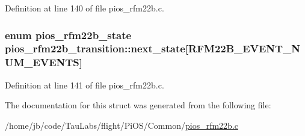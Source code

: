 \-Definition at line 140 of file pios\-\_\-rfm22b.\-c.

\hypertarget{structpios__rfm22b__transition_a0ad51f078fbfc8b875e6a26efe0b218b}{
\subsubsection[{next\-\_\-state}]{\setlength{\rightskip}{0pt plus 5cm}enum {\bf pios\-\_\-rfm22b\-\_\-state} {\bf pios\-\_\-rfm22b\-\_\-transition\-::next\-\_\-state}\mbox{[}{\bf \-R\-F\-M22\-B\-\_\-\-E\-V\-E\-N\-T\-\_\-\-N\-U\-M\-\_\-\-E\-V\-E\-N\-T\-S}\mbox{]}}}\label{structpios__rfm22b__transition_a0ad51f078fbfc8b875e6a26efe0b218b}


\-Definition at line 141 of file pios\-\_\-rfm22b.\-c.



\-The documentation for this struct was generated from the following file\-:\begin{DoxyCompactItemize}
\item 
/home/jb/code/\-Tau\-Labs/flight/\-Pi\-O\-S/\-Common/\hyperlink{pios__rfm22b_8c}{pios\-\_\-rfm22b.\-c}\end{DoxyCompactItemize}
